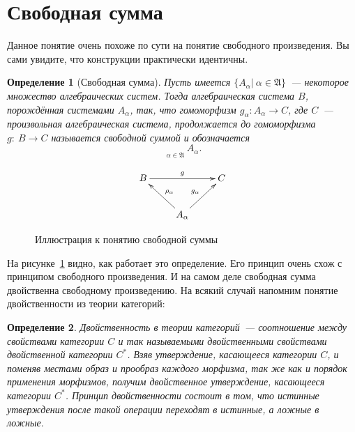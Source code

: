\documentclass[a4paper, 12pt]{report}
\newtheorem{definition}{Определение}[chapter]
\begin{document}
\section{Свободная сумма}
Данное понятие очень похоже по сути на понятие свободного произведения. Вы сами увидите, что конструкции практически идентичны.

\begin{definition}[Свободная сумма]
Пусть имеется $\{A_{\alpha}|\ \alpha\in\mathfrak{A}\}$~--- некоторое множество алгебраических систем. Тогда алгебраическая система $B$, порождённая системами $A_{\alpha}$, так, что гомоморфизм $g_{\alpha}: A_{\alpha} \rightarrow C$, где $C$~--- произвольная алгебраическая система, продолжается до гомоморфизма $g:\ B\rightarrow C$ называется свободной суммой и обозначается
\[
\mathop{\textstyle{\sum^*}}\limits_{\alpha\in\mathfrak{A}} A_{\alpha}.
\]
\end{definition}


\begin{figure}[!h]
\begin{equation*}
\xymatrix{
B\ar[rr]^g & & C\\
 & A_{\alpha}\ar[lu]_{\rho_{\alpha}}\ar[ru]^{g_{\alpha}}
}
\end{equation*}
\caption{Иллюстрация к понятию свободной суммы}
\label{fig::free_sum}
\end{figure}

На рисунке~\ref{fig::free_sum} видно, как работает это определение. Его принцип очень схож с принципом свободного произведения. И на самом деле свободная сумма двойственна свободному произведению. На всякий случай напомним понятие двойственности из теории категорий:

\begin{definition}
Двойственность в теории категорий~--- соотношение между свойствами категории $C$ и так называемыми двойственными свойствами двойственной категории $C^*$. Взяв утверждение, касающееся категории $C$, и поменяв местами образ и прообраз каждого морфизма, так же как и порядок применения морфизмов, получим двойственное утверждение, касающееся категории $C^*$. Принцип двойственности состоит в том, что истинные утверждения после такой операции переходят в истинные, а ложные в ложные.
\end{definition}
\end{document}
